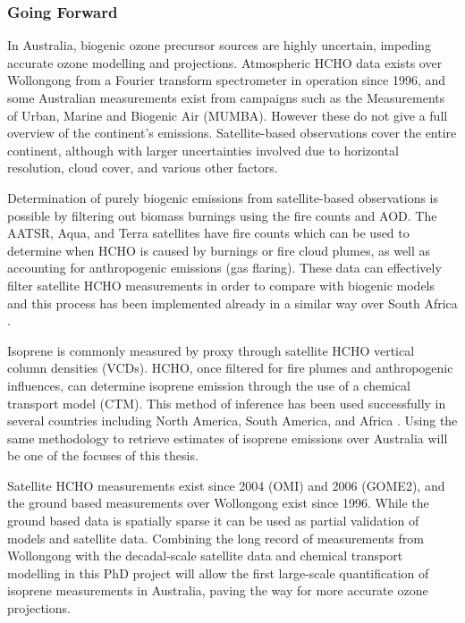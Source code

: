 \subsubsection{Going Forward}
In Australia, biogenic ozone precursor sources are highly uncertain, impeding accurate ozone modelling and projections.
Atmospheric HCHO data exists over Wollongong from a Fourier transform spectrometer in operation since 1996, and some Australian measurements exist from campaigns such as the Measurements of Urban, Marine and Biogenic Air (MUMBA).
However these do not give a full overview of the continent's emissions. Satellite-based observations cover the entire continent, although with larger uncertainties involved due to horizontal resolution, cloud cover, and various other factors. 

Determination of purely biogenic emissions from satellite-based observations is possible by filtering out biomass burnings using the fire counts and AOD.
The AATSR, Aqua, and Terra satellites have fire counts which can be used to determine when HCHO is caused by burnings or fire cloud plumes, as well as accounting for anthropogenic emissions (gas flaring).
These data can effectively filter satellite HCHO measurements in order to compare with biogenic models and this process has been implemented already in a similar way over South Africa \cite{Marais_2012}.

Isoprene is commonly measured by proxy through satellite HCHO vertical column densities (VCDs). HCHO, once filtered for fire plumes and anthropogenic influences, can determine isoprene emission through the use of a chemical transport model (CTM).
This method of inference has been used successfully in several countries including North America\cite{Palmer_2003}, South America\cite{Barkley_2013}, and Africa \cite{Marais_2012}.
Using the same methodology to retrieve estimates of isoprene emissions over Australia will be one of the focuses of this thesis.

Satellite HCHO measurements exist since 2004 (OMI) and 2006 (GOME2), and the ground based measurements over Wollongong exist since 1996. While the ground based data is spatially sparse it can be used as partial validation of models and satellite data. 
Combining the long record of measurements from Wollongong with the decadal-scale satellite data and chemical transport modelling in this PhD project will allow the first large-scale quantification of isoprene measurements in Australia, paving the way for more accurate ozone projections.
